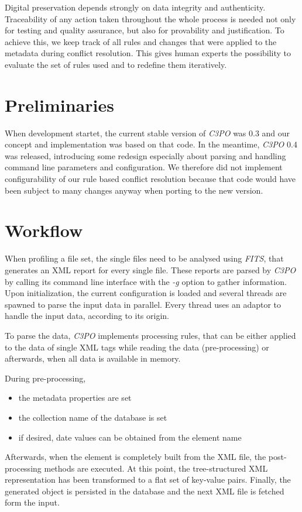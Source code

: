 \documentclass[a4paper,12pt]{article}
\begin{document}
Digital preservation depends strongly on data integrity and authenticity. Traceability of any action taken throughout the whole process is needed not only for testing and quality assurance, but also for provability and justification. To achieve this, we keep track of all rules and changes that were applied to the metadata during conflict resolution. This gives human experts the possibility to evaluate the set of rules used and to redefine them iteratively.

\section{Preliminaries}
When development startet, the current stable version of \emph{C3PO} was 0.3 and our concept and implementation was based on that code. In the meantime, \emph{C3PO} 0.4 was released, introducing some redesign especially about parsing and handling command line parameters and configuration. We therefore did not implement configurability of our rule based conflict resolution because that code would have been subject to many changes anyway when porting to the new version.

\section{Workflow}
When profiling a file set, the single files need to be analysed using \emph{FITS}, that generates an XML report for every single file. These reports are parsed by \emph{C3PO} by calling its command line interface with the \emph{-g} option to gather information. Upon initialization, the current configuration is loaded and several threads are spawned to parse the input data in parallel. Every thread uses an adaptor to handle the input data, according to its origin.

To parse the data, \emph{C3PO} implements processing rules, that can be either applied to the data of single XML tags while reading the data (pre-processing) or afterwards, when all data is available in memory.

During pre-processing, 
\begin{itemize}
\item the metadata properties are set
\item the collection name of the database is set
\item if desired, date values can be obtained from the element name
\end{itemize}
Afterwards, when the element is completely built from the XML file, the post-processing methods are executed. At this point, the tree-structured XML representation has been transformed to a flat set of key-value pairs. Finally, the generated object is persisted in the database and the next XML file is fetched form the input.
\end{document}
